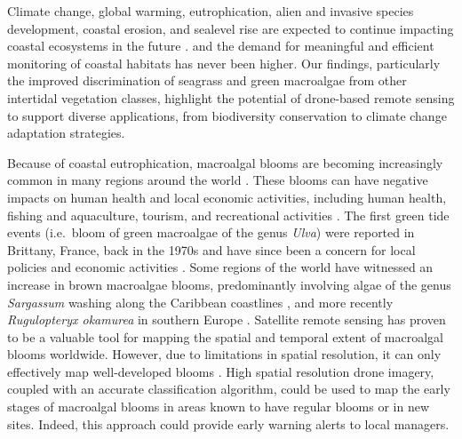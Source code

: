 \documentclass[
  number]{elsarticle}
\begin{document}
Climate change, global warming, eutrophication, alien and invasive
species development, coastal erosion, and sealevel rise are expected to
continue impacting coastal ecosystems in the future
\citetext{\citealp{SCHIBALSKI2022101414}; \citealp[
]{holon2018predictive}; \citealp{marquet2024global}}. and the demand for
meaningful and efficient monitoring of coastal habitats has never been
higher\citetext{\citealp[ ]{muller2018satellite}; \citealp[
]{villalobos2023remote}; \citealp{oiry2021using}}. Our findings,
particularly the improved discrimination of seagrass and green
macroalgae from other intertidal vegetation classes, highlight the
potential of drone-based remote sensing to support diverse applications,
from biodiversity conservation to climate change adaptation strategies.

Because of coastal eutrophication, macroalgal blooms are becoming
increasingly common in many regions around the world \citetext{\citealp[
]{sutton2011european}; \citealp{ye2011green}}. These blooms can have
negative impacts on human health and local economic activities,
including human health, fishing and aquaculture, tourism, and
recreational activities \citetext{\citealp[
]{villares1999nitrogen}; \citealp{ye2011green}}. The first green tide
events (i.e.~bloom of green macroalgae of the genus \emph{Ulva}) were
reported in Brittany, France, back in the 1970s and have since been a
concern for local policies and economic activities
\citep{menesguen2018marees}. Some regions of the world have witnessed an
increase in brown macroalgae blooms, predominantly involving algae of
the genus \emph{Sargassum} washing along the Caribbean coastlines
\citep{louime2017sargassum}, and more recently \emph{Rugulopteryx
okamurea} in southern Europe \citep{Roca2022}. Satellite remote sensing
has proven to be a valuable tool for mapping the spatial and temporal
extent of macroalgal blooms worldwide. However, due to limitations in
spatial resolution, it can only effectively map well-developed blooms
\citetext{\citealp[ ]{rs13081408}; \citealp[
]{klemas2012remote}; \citealp{haro2023biointertidal}}. High spatial
resolution drone imagery, coupled with an accurate classification
algorithm, could be used to map the early stages of macroalgal blooms in
areas known to have regular blooms or in new sites. Indeed, this
approach could provide early warning alerts to local managers.
\end{document}
